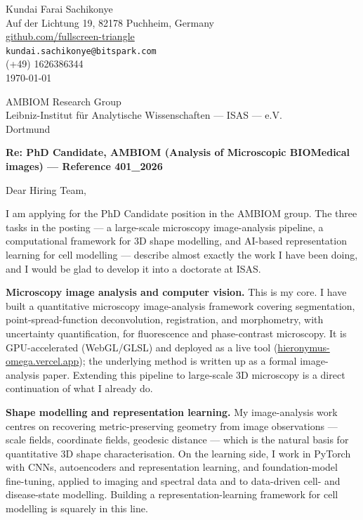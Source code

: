 \documentclass[12pt,a4paper]{article}
\begin{document}
\begin{flushright}
Kundai Farai Sachikonye \\
Auf der Lichtung 19, 82178 Puchheim, Germany \\
\href{https://github.com/fullscreen-triangle}{github.com/fullscreen-triangle} \\
\texttt{kundai.sachikonye@bitspark.com} \\
(+49) 1626386344 \\[6pt]
\today
\end{flushright}

\vspace{1em}

AMBIOM Research Group \\
Leibniz-Institut für Analytische Wissenschaften --- ISAS --- e.V. \\
Dortmund

\vspace{1.5em}

\textbf{Re: PhD Candidate, AMBIOM (Analysis of Microscopic BIOMedical images) ---
Reference 401\_2026}

\vspace{1em}

Dear Hiring Team,

I am applying for the PhD Candidate position in the AMBIOM group. The three tasks
in the posting --- a large-scale microscopy image-analysis pipeline, a
computational framework for 3D shape modelling, and AI-based representation
learning for cell modelling --- describe almost exactly the work I have been
doing, and I would be glad to develop it into a doctorate at ISAS.

\textbf{Microscopy image analysis and computer vision.}
This is my core. I have built a quantitative microscopy image-analysis framework
covering segmentation, point-spread-function deconvolution, registration, and
morphometry, with uncertainty quantification, for fluorescence and phase-contrast
microscopy. It is GPU-accelerated (WebGL/GLSL) and deployed as a live tool
(\href{https://hieronymus-omega.vercel.app/}{hieronymus-omega.vercel.app}); the
underlying method is written up as a formal image-analysis paper. Extending this
pipeline to large-scale 3D microscopy is a direct continuation of what I already
do.

\textbf{Shape modelling and representation learning.}
My image-analysis work centres on recovering metric-preserving geometry from
image observations --- scale fields, coordinate fields, geodesic distance --- which
is the natural basis for quantitative 3D shape characterisation. On the learning
side, I work in PyTorch with CNNs, autoencoders and representation learning, and
foundation-model fine-tuning, applied to imaging and spectral data and to
data-driven cell- and disease-state modelling. Building a representation-learning
framework for cell modelling is squarely in this line.
\end{document}
